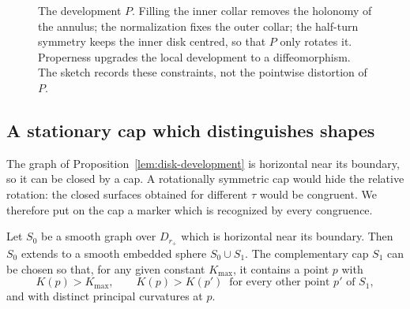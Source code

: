 \begin{figure}[htbp]
\centering
{}
\caption{The development $P$. Filling the inner collar removes the
holonomy of the annulus; the normalization fixes the outer collar; the
half-turn symmetry keeps the inner disk centred, so that $P$ only
rotates it. Properness upgrades the local development to a
diffeomorphism. The sketch records these constraints, not the
pointwise distortion of $P$.}
\label{fig:development}
\end{figure}

\subsection{A stationary cap which distinguishes shapes}

The graph of Proposition~\ref{lem:disk-development} is horizontal near
its boundary, so it can be closed by a cap. A rotationally symmetric
cap would hide the relative rotation: the closed surfaces obtained for
different $\tau$ would be congruent. We therefore put on the cap a
marker which is recognized by every congruence.

\begin{lemma}\label{lem:fixed-cap}
Let $S_0$ be a smooth graph over $D_{r_+}$ which is horizontal near its
boundary. Then $S_0$ extends to a smooth embedded sphere $S_0\cup S_1$.
The complementary cap $S_1$ can be chosen so that, for any given
constant $K_{\max}$, it contains a point $p$ with
\[
 K(p)>K_{\max},\qquad K(p)>K(p')\ \text{ for every other point }p'
 \text{ of }S_1,
\]
and with distinct principal curvatures at $p$.
\end{lemma}

